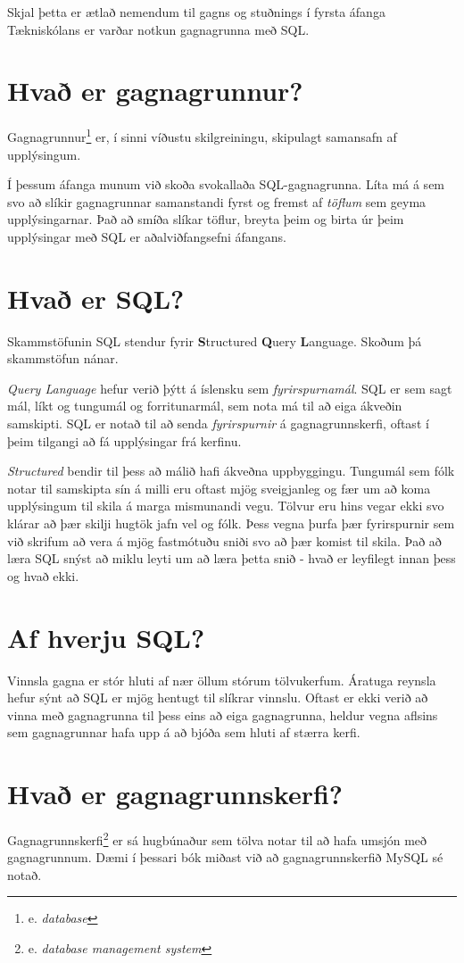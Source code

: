 Skjal þetta er ætlað nemendum til gagns og stuðnings í fyrsta áfanga Tækniskólans er varðar notkun gagnagrunna með SQL.
\section{Hvað er gagnagrunnur?}
Gagnagrunnur\footnote{e. \emph{database}} er, í sinni víðustu skilgreiningu, skipulagt samansafn af upplýsingum.

Í þessum áfanga munum við skoða svokallaða SQL-gagnagrunna.
Líta má á sem svo að slíkir gagnagrunnar samanstandi fyrst og fremst af \emph{töflum} sem geyma upplýsingarnar. Það að smíða slíkar töflur, breyta þeim og birta úr þeim upplýsingar með SQL er aðalviðfangsefni áfangans.
\section{Hvað er SQL?}
Skammstöfunin SQL stendur fyrir \textbf{S}tructured \textbf{Q}uery \textbf{L}anguage. Skoðum þá skammstöfun nánar.

\emph{Query Language} hefur verið þýtt á íslensku sem \emph{fyrirspurnamál}. SQL er sem sagt mál, líkt og tungumál og forritunarmál, sem nota má til að eiga ákveðin samskipti. SQL er notað til að senda \emph{fyrirspurnir} á gagnagrunnskerfi, oftast í þeim tilgangi að fá upplýsingar frá kerfinu.

\emph{Structured} bendir til þess að málið hafi ákveðna uppbyggingu. Tungumál sem fólk notar til samskipta sín á milli eru oftast mjög sveigjanleg og fær um að koma upplýsingum til skila á marga mismunandi vegu. Tölvur eru hins vegar ekki svo klárar að þær skilji hugtök jafn vel og fólk. Þess vegna þurfa þær fyrirspurnir sem við skrifum að vera á mjög fastmótuðu sniði svo að þær komist til skila. Það að læra SQL snýst að miklu leyti um að læra þetta snið - hvað er leyfilegt innan þess og hvað ekki.
\section{Af hverju SQL?}
Vinnsla gagna er stór hluti af nær öllum stórum tölvukerfum. Áratuga reynsla hefur sýnt að SQL er mjög hentugt til slíkrar vinnslu. Oftast er ekki verið að vinna með gagnagrunna til þess eins að eiga gagnagrunna, heldur vegna aflsins sem gagnagrunnar hafa upp á að bjóða sem hluti af stærra kerfi.
\section{Hvað er gagnagrunnskerfi?}
\label{undirkafli:gagnagrunnskerfi}
Gagnagrunnskerfi\footnote{e. \emph{database management system}} er sá hugbúnaður sem tölva notar til að hafa umsjón með gagnagrunnum. Dæmi í þessari bók miðast við að gagnagrunnskerfið MySQL sé notað.

